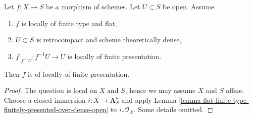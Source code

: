 \begin{lemma}
\label{lemma-flat-finite-type-finitely-presented-over-dense-open-X}
Let $f : X \to S$ be a morphism of schemes. Let $U \subset S$ be open.
Assume
\begin{enumerate}
\item $f$ is locally of finite type and flat,
\item $U \subset S$ is retrocompact and scheme theoretically dense,
\item $f|_{f^{-1}U} : f^{-1}U \to U$ is locally of finite presentation.
\end{enumerate}
Then $f$ is of locally of finite presentation.
\end{lemma}

\begin{proof}
The question is local on $X$ and $S$, hence we may assume $X$ and
$S$ affine. Choose a closed immersion $i : X \to \mathbf{A}^n_S$
and apply
Lemma \ref{lemma-flat-finite-type-finitely-presented-over-dense-open}
to $i_*\mathcal{O}_X$. Some details omitted.
\end{proof}
